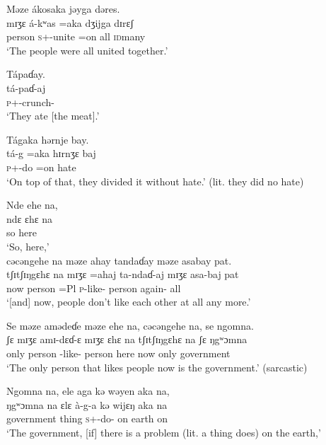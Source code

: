 \ea Məze  ákosaka  jəyga  dəres. \\
\gll mɪʒɛ   á-kʷas    =aka   dʒijga   dɪrɛʃ\\
 person  \textsc{s}+{\IFV}-unite  =on  all  \textsc{id}many\\
 \glt ‘The people were all united together.’
\z

\ea  Tápaɗay.\\ 
 \gll tá-paɗ-aj \\
 \textsc{p}+{\IFV}-crunch{}-{\CL}\\
 \glt ‘They ate [the meat].’
 \z

\ea Tágaka  hərnje  bay.\\
 \gll tá-g    =aka   hɪrnʒɛ   baj\\
 \textsc{p}+{\IFV}-do  =on  hate  {\NEG}\\
 \glt ‘On top of that, they divided it without hate.’ (lit. they did no hate)
 \z

\ea Nde  ehe  na,   \\
 \gll ndɛ   ɛhɛ      na \\
 so  here   {\PSP}     \\
 \glt ‘So, here,’\\
 
 \medskip
 cəcəngehe  na  məze  ahay  tandaɗay  məze  asabay  pat.\\
 \gll tʃɪtʃɪŋgɛhɛ  na   mɪʒɛ  =ahaj   ta-ndaɗ-aj     mɪʒɛ  asa-baj     pat\\
 now           {\PSP}  person  =Pl  \textsc{p}-like-{\CL}    person  again-{\NEG}  all\\
 \glt ‘[and] now, people don’t like each other at all any more.’
 \z

\ea Se  məze  amədeɗe  məze  ehe  na, cəcəngehe  na,  se  ngomna.   \\
 \gll ʃɛ    mɪʒɛ     amɪ-dɛɗ-ɛ  mɪʒɛ  ɛhɛ     na tʃɪtʃɪŋgɛhɛ  na   ʃɛ   ŋgʷɔmna\\
 only    person  {\DEP}-like-{\CL}  person  here  {\PSP}  now    {\PSP}  only  government \\
 \glt ‘The only person that likes people now is the government.’ (sarcastic)\\
 \z
 
\ea Ngomna  na,    ele  aga  kə  wəyen  aka  na,\\
 \gll ŋgʷɔmna   na  ɛlɛ   à-g-a     kə  wijɛŋ   aka  na\\
 government  {\PSP}  thing  \textsc{s}+{\PFV}-do-{\CL}  on    earth  on      {\PSP}  \\
 \glt ‘The government, [if]  there is a problem (lit. a thing does) on the earth,’\\
 
